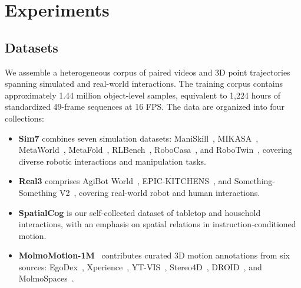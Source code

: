 \section{Experiments}
\label{sec:experiments}

\subsection{Datasets}

We assemble a heterogeneous corpus of paired videos
and 3D point trajectories spanning simulated and real-world
interactions.
The training corpus contains approximately 1.44 million
object-level samples, equivalent to 1,224 hours of
standardized 49-frame sequences at 16 FPS.
The data are organized into four collections:
\begin{itemize}
    \raggedright
    \item \textbf{Sim7} combines seven simulation datasets:
    ManiSkill~\citep{tao2024maniskill3},
    MIKASA~\citep{cherepanov2026memory},
    MetaWorld~\citep{yu2020meta},
    MetaFold~\citep{chen2025metafold},
    RLBench~\citep{james2020rlbench},
    RoboCasa~\citep{nasiriany2024robocasa}, and
    RoboTwin~\citep{mu2025robotwin},
    covering diverse robotic interactions and manipulation tasks.

    \item \textbf{Real3} comprises
    AgiBot World~\citep{bu2025agibot},
    EPIC-KITCHENS~\citep{damen2018epickitchens}, and
    Something-Something V2~\citep{goyal2017something},
    covering real-world robot and human interactions.

    \item \textbf{SpatialCog} is our self-collected dataset
    of tabletop and household interactions, with an emphasis
    on spatial relations in instruction-conditioned motion.

    \item \textbf{MolmoMotion-1M}~\citep{zhang2026molmomotion}
    contributes curated 3D motion annotations from six sources:
    EgoDex~\citep{hoque2025egodex},
    Xperience~\citep{ropedia2026xperience},
    YT-VIS~\citep{Yang_2019_ICCV},
    Stereo4D~\citep{Jin_2025_CVPR},
    DROID~\citep{khazatsky2024droid}, and
    MolmoSpaces~\citep{kim2026molmospaces}.
\end{itemize}

